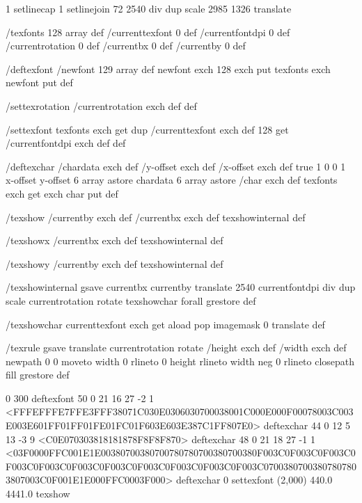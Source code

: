 1 setlinecap 1 setlinejoin
72 2540 div dup scale
2985 1326 translate



/texfonts 128 array def
/currenttexfont 0 def
/currentfontdpi 0 def
/currentrotation 0 def
/currentbx 0 def
/currentby 0 def

/deftexfont
 { /newfont 129 array def
   newfont exch 128 exch put
   texfonts exch newfont put } def

/settexrotation
 { /currentrotation exch def } def

/settexfont
 { texfonts exch get dup /currenttexfont exch def
   128 get /currentfontdpi exch def } def

/deftexchar
 { /chardata exch def
   /y-offset exch def
   /x-offset exch def
   true
   1 0 0 1 x-offset y-offset 6 array astore
   chardata
   6 array astore /char exch def
   texfonts exch get exch char put } def

/texshow
 { /currentby exch def
   /currentbx exch def
   texshowinternal } def

/texshowx
 { /currentbx exch def
   texshowinternal } def

/texshowy
 { /currentby exch def
   texshowinternal } def

/texshowinternal
 { gsave
   currentbx currentby translate
   2540 currentfontdpi div dup scale
   currentrotation rotate
   {texshowchar} forall
   grestore } def

/texshowchar
   { currenttexfont exch get aload pop imagemask 0 translate } def

/texrule
 { gsave
   translate
   currentrotation rotate
   /height exch def
   /width exch def
   newpath
    0 0 moveto
    width 0 rlineto
    0 height rlineto
    width neg 0 rlineto
    closepath
    fill
   grestore } def

0 300 deftexfont
50 0 21 16 27 -2 1 {{<FFFEFFFE7FFE3FFF38071C030E0306030700038001C000E000F00078003C003E003E601FF01FF01FE01FC01F603E603E387C1FF807E0>}} deftexchar
44 0 12 5 13 -3 9 {{<C0E070303818181878F8F8F870>}} deftexchar
48 0 21 18 27 -1 1 {{<03F0000FFC001E1E00380700380700780780700380700380F003C0F003C0F003C0F003C0F003C0F003C0F003C0F003C0F003C0F003C0F003C07003807003807807803807003C0F001E1E000FFC0003F000>}} deftexchar
0 settexfont
(2,000) 440.0 4441.0 texshow



